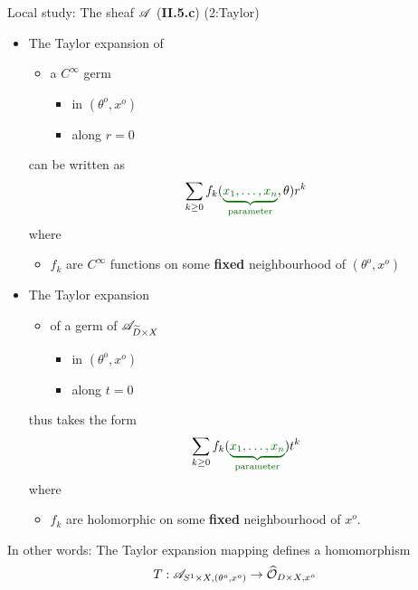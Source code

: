 \begin{frame}[t]{Local study: The sheaf $\mathscr{A}$ (\textbf{II.5.c}) (2:Taylor)}
  \begin{itemize}
    \item The Taylor expansion of
      \begin{itemize}
        \item a $C^\infty$ germ
          \begin{itemize}
            \item in $(\theta^o,x^o)$
            \item along $r=0$
          \end{itemize}
      \end{itemize}
      can be written as
      \[
        \sum_{k\geq0}f_k(\textcolor{green!40!black}{\underset{\text{parameter}}
          {\underbrace{x_1,\ldots,x_n}}},\theta)r^k
      \]
      where
      \begin{itemize}
        \item $f_k$ are $C^\infty$ functions on some \textbf{fixed}
          neighbourhood of $(\theta^o,x^o)$
      \end{itemize}
    \item The Taylor expansion
      \begin{itemize}
        \item of a germ of $\mathscr{A}_{\widetilde D\times X}$
          \begin{itemize}
            \item in $(\theta^o,x^o)$
            \item along $t=0$
          \end{itemize}
      \end{itemize}
      thus takes the form
      \[
        \sum_{k\geq0}f_k(\textcolor{green!40!black}{\underset{\text{parameter}}
          {\underbrace{x_1,\ldots,x_n}}})t^k
      \]
      where
      \begin{itemize}
        \item $f_k$ are holomorphic on some \textbf{fixed} neighbourhood of
          $x^o$.
      \end{itemize}
  \end{itemize}
  In other words: The Taylor expansion mapping defines a homomorphism
  \[
    T:\mathscr{A}_{S^1\times X,(\theta^o,x^o)}\to\widehat{\mathcal{O}}_{D\times X,x^o}
  \]
\end{frame}

